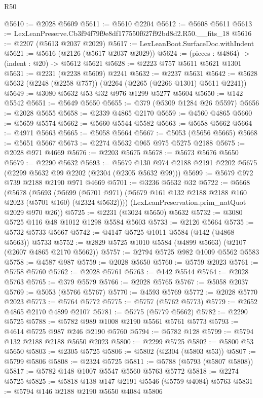 \begin{lexlean}{R50}
\begin{coremodule}
@5610 := @2028 @5609
@5611 := @5610 @2204
@5612 := @5608 @5611
@5613 := LexLeanPreserve.Cb3f94f79f9e8df177550f627f92bd8d2.R50.__fits_18
@5616 := @2207 (@5613 @2037 @2029)
@5617 := LexLeanBoot.SurfaceDoc.withIndent
@5621 := @5616 (@2126 (@5617 @2037 @2029))
@5624 := (pieces : @4864) -> (indent : @20) -> @5612 @5621
@5628 := @2223 @757 @5611 @5621 @1301
@5631 := @2231 (@2238 @5609) @2241
@5632 := @2237 @5631
@5642 := @5628 @5632 (@2248 (@2258 @757)) (@2264 (@2265 (@2266 @1301) @5611 @2241))
@5649 := @3080 @5632 @53 @32 @976 @1299 @5277 @5604
@5650 := @142 @5542
@5651 := @5649 @5650
@5655 := @379 (@5309 @1284 @26 @5597)
@5656 := @2028 @5655
@5658 := @2339 @4865 @2170
@5659 := @4560 @4865
@5660 := @5659 @5574
@5662 := @5660 @5544 @5582
@5663 := @5658 @5662
@5664 := @4971 @5663
@5665 := @5058 @5664
@5667 := @5053 (@5656 @5665)
@5668 := @5651 @5667
@5673 := @2274 @5632 @965 @975 @5275 @2188
@5675 := @2028 @971 @4669
@5676 := @2203 @5675
@5678 := @5673 @5676 @5650
@5679 := @2290 @5632
@5693 := @5679 @130 @974 @2188 @2191 @2202 @5675 (@2299 @5632 @99 @2202 (@2304 (@2305 @5632 @99)))
@5699 := @5679 @972 @739 @2188 @2190 @971 @4669
@5701 := @3236 @5632 @32
@5722 := @5668
    (@5678
      (@5693
        (@5699 (@5701 @971) (@5679 @161 @132 @2188 @2188 @160 @2023 (@5701 @160) (@2324 @5632))))
      (LexLeanPreservation.prim_natQuot @2029 @970 @26))
@5725 := @2231 (@3024 @5650) @5632
@5732 := @3080 @5725 @116 @48 @1012 @1298 @5584 @5603
@5733 := @2126 @5664
@5735 := @5732 @5733 @5667
@5742 := @4147 @5725 @1011 @5584 (@142 (@4868 @5663)) @5733
@5752 := @2829 @5725 @1010 @5584 (@4899 @5663) (@2107 (@2607 @4865 @2170 @5662))
@5757 := @2794 @5725 @982 @1009 @5562 @5583
@5758 := @4587 @987
@5759 := @2028 @5650
@5760 := @5759 @2023
@5761 := @5758 @5760
@5762 := @2028 @5761
@5763 := @142 @5544
@5764 := @2028 @5763
@5765 := @379 @5579
@5766 := @2028 @5765
@5767 := @5058 @2037
@5769 := @5053 (@5766 @5767)
@5770 := @4593 @5769
@5772 := @2028 @5770 @2023
@5773 := @5764 @5772
@5775 := @5757 (@5762 @5773)
@5779 := @2652 @4865 @2170 @4899 @2107
@5781 := @5775 (@5779 @5662)
@5782 := @2290 @5725
@5788 := @5782 @989 @1008 @2190 @5561 @5761 @5773
@5793 := @4614 @5725 @987 @246 @2190 @5760
@5794 := @5782 @128
@5799 := @5794 @132 @2188 @2188 @5650 @2023
@5800 := @2299 @5725
@5802 := @5800 @53 @5650
@5803 := @2305 @5725
@5806 := @5802 (@2304 (@5803 @53))
@5807 := @5799 @5806
@5808 := @2324 @5725
@5811 := @5788 (@5793 (@5807 @5808))
@5817 := @5782 @148 @1007 @5547 @5560 @5763 @5772
@5818 := @2274 @5725
@5825 := @5818 @138 @147 @2191 @5546 (@5759 @4084) @5763
@5831 := @5794 @146 @2188 @2190 @5650 @4084 @5806

\end{coremodule}
\end{lexlean}
